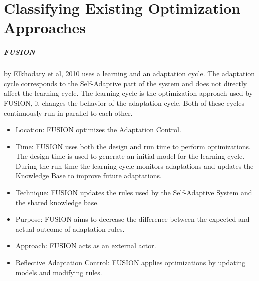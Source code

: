 \section{Classifying Existing Optimization Approaches}
\label{ch:Existing}




\subparagraph*{FUSION}
by Elkhodary et al, 2010 \cite*{FUSION}  uses a learning and an adaptation cycle.
The adaptation cycle corresponds to the Self-Adaptive part of the system
and does not directly affect the learning cycle.
The learning cycle is the optimization approach used by FUSION,
it changes the behavior of the adaptation cycle.
Both of these cycles continuously run in parallel to each other.
\begin{itemize}[nosep]
    \item Location: FUSION optimizes the Adaptation Control.
    \item Time: FUSION uses both the design and run time to perform optimizations.
    The design time is used to generate an initial model for the learning cycle.
    During the run time the learning cycle monitors adaptations
    and updates the Knowledge Base to improve future adaptations.
    \item Technique: FUSION updates the rules used by the Self-Adaptive System and the shared knowledge base.
    \item Purpose: FUSION aims to decrease the difference between the expected and actual outcome of adaptation rules.
    \item Approach: FUSION acts as an external actor.
    \item Reflective Adaptation Control: FUSION applies optimizations by updating models and modifying rules.
\end{itemize}

